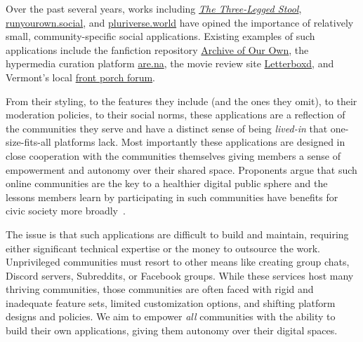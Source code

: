 Over the past several years,
works including
\emph{\href{https://publicinfrastructure.org/2023/03/29/the-three-legged-stool/}{The Three-Legged Stool}},
\href{https://runyourown.social}{runyourown.social},
and \href{https://pluriverse.world/}{pluriverse.world}
have opined the importance of relatively small,
community-specific social applications.
Existing examples of such applications include the fanfiction
repository \href{https://archiveofourown.org/}{Archive of Our Own},
the hypermedia curation platform \href{https://www.are.na}{are.na},
the movie review site \href{https://letterboxd.com/}{Letterboxd},
and Vermont's local \href{https://frontporchforum.com/}{front porch forum}.


%
From their styling, to the features they include (and the ones they omit),
to their moderation policies, to their social norms, these applications
are a reflection of the communities they serve and have a
distinct sense of being \emph{lived-in}
that one-size-fits-all platforms lack.
Most importantly these applications are designed in close cooperation with the communities themselves
giving members a sense of empowerment and autonomy over their shared space.
Proponents argue that such online communities are the key to a healthier
digital public sphere and the lessons members learn by participating in such
communities have benefits for civic society more broadly~\cite{threeleggedstool, runyourownsocial, archiveoftheirown}.

The issue is that such applications are difficult to build and maintain,
requiring either significant technical expertise or the money to outsource the work.
Unprivileged communities must resort to other means like creating group chats,
Discord servers, Subreddits, or Facebook groups. %
While these services host many thriving communities,
those communities are often faced with rigid and inadequate feature sets,
limited customization options, and shifting platform designs and policies.
We aim to empower \emph{all} communities with the ability to
build their own applications, giving them autonomy over their digital spaces.


